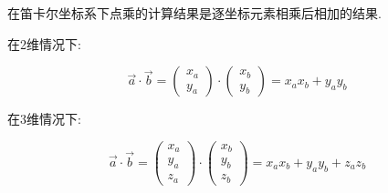\documentclass[openany]{progbookcn}
\begin{document}
在笛卡尔坐标系下点乘的计算结果是逐坐标元素相乘后相加的结果. 

在2维情况下: 

\begin{equation}
	\overrightarrow{a} \cdot \overrightarrow{b} = \begin{pmatrix}
		x_a\\ 
		y_a
	\end{pmatrix}\cdot
	\begin{pmatrix}
		x_b\\ 
		y_b
	\end{pmatrix}
	=x_ax_b+y_ay_b
\end{equation}

在3维情况下: 

\begin{equation}
	\overrightarrow{a} \cdot \overrightarrow{b} = \begin{pmatrix}
		x_a\\ 
		y_a\\
		z_a
	\end{pmatrix}\cdot
	\begin{pmatrix}
		x_b\\ 
		y_b\\
		z_b
	\end{pmatrix}
	=x_ax_b+y_ay_b+z_az_b 
\end{equation}
\end{document}
